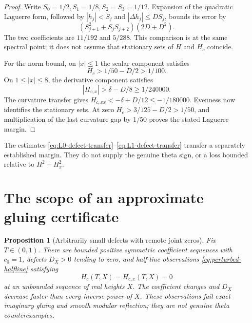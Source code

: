 \documentclass[11pt]{article}
\numberwithin{equation}{section}
\newtheorem{proposition}[theorem]{Proposition}
\theoremstyle{definition}
\theoremstyle{remark}
\begin{document}
\begin{proof}
Write \(S_0=1/2,S_1=1/8,S_2=S_3=1/12\).
Expansion of the quadratic Laguerre form, followed by
\(|h_j|<S_j\) and \(|\Delta h_j|\leq DS_j\), bounds its error by
\[
 (S_{j+1}^2+S_jS_{j+2})(2D+D^2).
\]
The two coefficients are \(11/192\) and \(5/288\).
This comparison is at the same spectral point; it does not assume
that stationary sets of \(H\) and \(H_c\) coincide.

For the norm bound, on \(|x|\leq1\) the scalar component satisfies
\[
 H_c>1/50-D/2>1/100.
\]
On \(1\leq|x|\leq8\), the derivative component satisfies
\[
 |H_{c,x}|>\delta-D/8\geq1/240000.
\]
The curvature transfer gives
\(H_{c,xx}<-\delta+D/12\leq-1/180000\).
Evenness now identifies the stationary sets.
At zero \(H_c>3/125-D/2>1/50\), and multiplication of the last
curvature gap by \(1/50\) proves the stated Laguerre margin.
\end{proof}

The estimates \eqref{eq:L0-defect-transfer}--\eqref{eq:L1-defect-transfer}
transfer a separately established margin.  They do not supply the
genuine theta sign, or a loss bounded relative to \(H^2+H_x^2\).

\section{The scope of an approximate gluing certificate}
\label{sec:remote-control}

\begin{proposition}[Arbitrarily small defects with remote joint zeros]
\label{prop:remote-gluing-controls}
Fix \(T\in(0,1)\).  There are bounded positive symmetric coefficient
sequences with \(c_0=1\), defects \(D_X>0\) tending to zero, and
half-line observations \eqref{eq:perturbed-halfline} satisfying
\[
 H_c(T,X)=H_{c,x}(T,X)=0
\]
at an unbounded sequence of real heights \(X\).
The coefficient changes and \(D_X\) decrease faster than every
inverse power of \(X\).  These observations fail exact imaginary
gluing and smooth modular reflection; they are not genuine theta
counterexamples.
\end{proposition}
\end{document}
